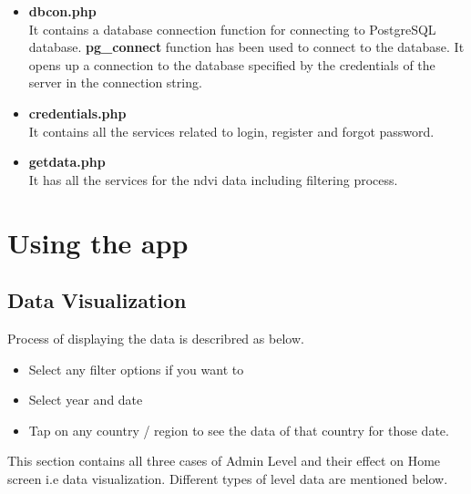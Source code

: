 \begin{itemize}
    \item \textbf{dbcon.php} \\
    It contains a database connection function for connecting to PostgreSQL database. \textbf{pg\_connect} function has been used to connect to the database. It opens up a connection to the database specified by the credentials of the server in the connection string. \\
    
    \item \textbf{credentials.php} \\
    It contains all the services related to login, register and forgot password. \\
    
    \item \textbf{getdata.php} \\
    It has all the services for the ndvi data including filtering process. \\
\end{itemize}

\section{Using the app}

\subsection{Data Visualization}



Process of displaying the data is describred as below.

\begin{itemize}
    \item Select any filter options if you want to
    \item Select year and date
    \item Tap on any country / region to see the data of that country for those date. \\
\end{itemize}

This section contains all three cases of Admin Level and their effect on Home screen i.e data visualization. Different types of level data are mentioned below.

